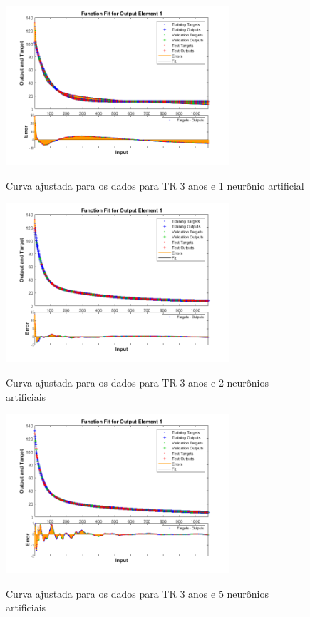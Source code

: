 
\begin{figure}[H]
    \caption{Curva ajustada para os dados para TR 3 anos e 1 neurônio artificial}
    \centering
    \includegraphics[width=0.74\textwidth]{Textuais/Figuras/NN/tr3-1neuronio.png}
    \label{fig:tr3-1n}
\end{figure}

\begin{figure}[H]
    \caption{Curva ajustada para os dados para TR 3 anos e 2 neurônios artificiais}
    \centering
    \includegraphics[width=0.74\textwidth]{Textuais/Figuras/NN/tr3-2neuronio.png}
    \label{fig:tr3-2n}
\end{figure}

\begin{figure}[H]
    \caption{Curva ajustada para os dados para TR 3 anos e 5 neurônios artificiais}
    \centering
    \includegraphics[width=0.74\textwidth]{Textuais/Figuras/NN/tr3-5neuronio.png}
    \label{fig:tr3-5n}
\end{figure}

